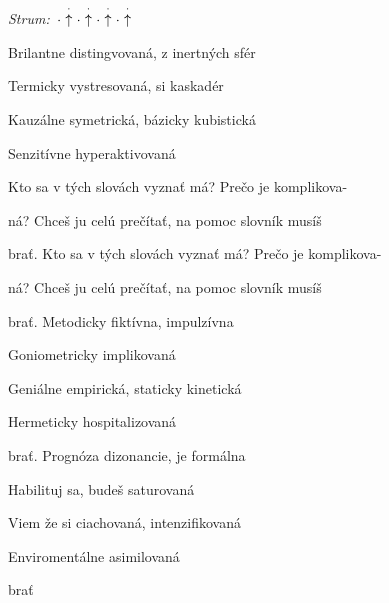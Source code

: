 \begin{song}


 \quad
\textit{Strum:} $\Miss\StaccatoUp\Miss\StaccatoUp\Miss\StaccatoUp\Miss\StaccatoUp$ \quad

\large


\Large

\bigskip


 Brilantne distingvovaná, z inertných sfér \par
{} Termicky vystresovaná, si kaskadér \par
{} Kauzálne symetrická,  bázicky kubistická \par
{} Senzitívne hyperaktivovaná \par

\bigskip

\begin{chorusboxwide}{\Refren}
 Kto sa v tých slovách vyznať má? Prečo je komplikova- \par
{}ná? Chceš ju celú prečítať, na pomoc slovník musíš \par
{}brať. Kto sa v tých slovách vyznať má? Prečo je komplikova- \par
{}ná? Chceš ju celú prečítať, na pomoc slovník musíš \par
\end{chorusboxwide}

\bigskip

brať. Metodicky fiktívna, impulzívna \par
{} Goniometricky implikovaná \par
{} Geniálne empirická,  staticky kinetická \par
{} Hermeticky hospitalizovaná \par

\bigskip

\Refren

\bigskip

brať. Prognóza dizonancie, je formálna \par
{} Habilituj sa, budeš saturovaná \par
{} Viem že si ciachovaná,  intenzifikovaná \par
{} Enviromentálne asimilovaná \par

\bigskip

\Refren

\bigskip

brať

\end{song}
